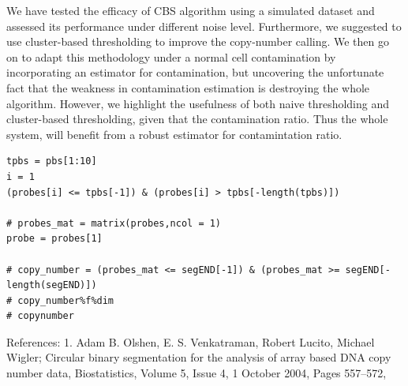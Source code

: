 \documentclass[]{article}
\begin{document}
We have tested the efficacy of CBS algorithm using a simulated dataset
and assessed its performance under different noise level. Furthermore,
we suggested to use cluster-based thresholding to improve the
copy-number calling. We then go on to adapt this methodology under a
normal cell contamination by incorporating an estimator for
contamination, but uncovering the unfortunate fact that the weakness in
contamination estimation is destroying the whole algorithm. However, we
highlight the usefulness of both naive thresholding and cluster-based
thresholding, given that the contamination ratio. Thus the whole system,
will benefit from a robust estimator for contamintation ratio.

\begin{verbatim}
tpbs = pbs[1:10]
i = 1
(probes[i] <= tpbs[-1]) & (probes[i] > tpbs[-length(tpbs)]) 

# probes_mat = matrix(probes,ncol = 1)
probe = probes[1]

# copy_number = (probes_mat <= segEND[-1]) & (probes_mat >= segEND[-length(segEND)])
# copy_number%f%dim
# copynumber
\end{verbatim}

References: 1. Adam B. Olshen, E. S. Venkatraman, Robert Lucito, Michael
Wigler; Circular binary segmentation for the analysis of array based DNA
copy number data, Biostatistics, Volume 5, Issue 4, 1 October 2004,
Pages 557--572,
\end{document}
